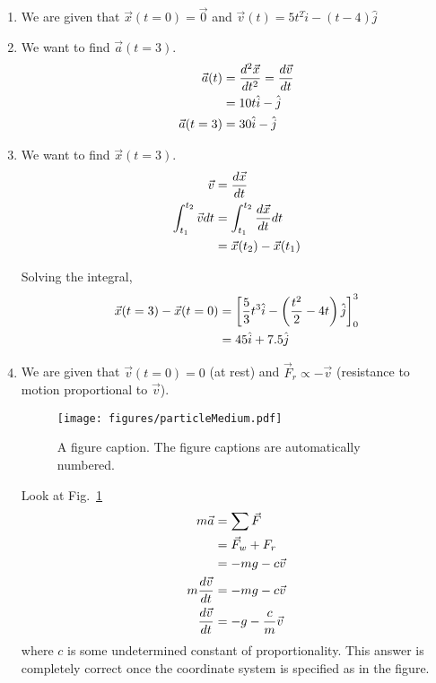 \begin{enumerate}[label = \bfseries (\alph*)]
\item We are given that $\vec{x}(t=0) = \vec{0}$ and $\vec{v}(t) = 5t^2 \hat{i} - (t-4)\hat{j}$
\item We want to find $\vec{a}(t=3)$.
\begin{align}
   \vec{a}(t) & = \frac{d^2 \vec{x}}{dt^2} = \frac{d\vec{v}}{dt} \nonumber \\
   &= 10 t \hat{i}  - \hat{j}  \nonumber \\
   \vec{a} (t=3) &= 30 \hat{i} - \hat{j}
\end{align}

\item We want to find $\vec{x}(t=3)$.
\begin{align}
   \vec{v} &= \frac{d\vec{x}}{dt} \nonumber \\
   \int_{t_1}^{t_2} \vec{v} dt &=  \int_{t_1}^{t_2} \frac{d\vec{x}}{dt}  dt\nonumber \\
         &=\vec{x}(t_2) - \vec{x}(t_1)
\end{align}

Solving the integral, 
\begin{align}
   \vec{x}(t=3) - \vec{x}(t=0) &= \left[ \frac{5}{3}t^3 \hat{i} - \left(\frac{t^2}{2} - 4t\right)\hat{j}\right]^{3}_0 \nonumber \\
   &= 45 \hat{i} + 7.5 \hat{j}
\end{align}


\item We are given that $\vec{v}(t=0) = 0$ (at rest) and $\vec{F}_r \propto -\vec{v}$ (resistance to motion proportional to $\vec{v}$). 


\begin{figure}
\begin{center}
\texttt{[image: figures/particleMedium.pdf]}
\caption{\label{2015:q5:fig:particle1} A figure caption. The figure captions are
automatically numbered.}
\end{center}
\end{figure}

Look at Fig.~\ref{2015:q5:fig:particle1}
\begin{align}
   m \vec{a} &= \sum \vec{F} \nonumber\\
    &= \vec{F}_w + F_r \nonumber \\
   &= -m g - c \vec{v} \nonumber \\
   m \frac{d\vec{v}}{dt} &= -mg - c \vec{v} \nonumber \\
    \frac{d\vec{v}}{dt} &= -g - \frac{c}{m} \vec{v}
\end{align}
where $c$ is some undetermined constant of proportionality. This answer is completely correct once the coordinate system is specified as in the figure.


\end{enumerate}
